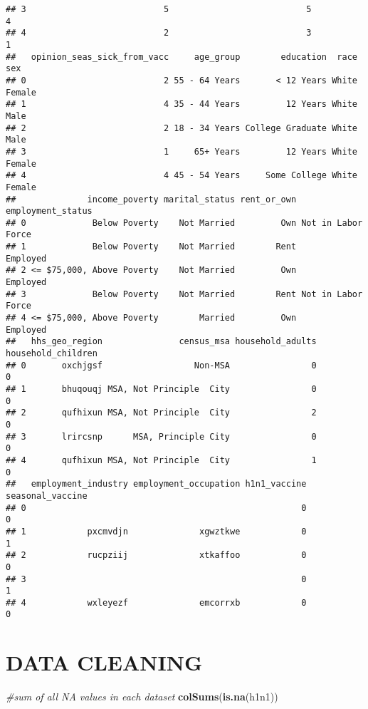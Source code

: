 \documentclass[
]{article}
\newenvironment{Shaded}{\begin{snugshade}}{\end{snugshade}}
\newcommand{\CommentTok}[1]{\textcolor[rgb]{0.56,0.35,0.01}{\textit{#1}}}
\newcommand{\FunctionTok}[1]{\textcolor[rgb]{0.13,0.29,0.53}{\textbf{#1}}}
\newcommand{\NormalTok}[1]{#1}
\begin{document}
\begin{verbatim}
## 3                           5                           5                 4
## 4                           2                           3                 1
##   opinion_seas_sick_from_vacc     age_group        education  race    sex
## 0                           2 55 - 64 Years       < 12 Years White Female
## 1                           4 35 - 44 Years         12 Years White   Male
## 2                           2 18 - 34 Years College Graduate White   Male
## 3                           1     65+ Years         12 Years White Female
## 4                           4 45 - 54 Years     Some College White Female
##              income_poverty marital_status rent_or_own  employment_status
## 0             Below Poverty    Not Married         Own Not in Labor Force
## 1             Below Poverty    Not Married        Rent           Employed
## 2 <= $75,000, Above Poverty    Not Married         Own           Employed
## 3             Below Poverty    Not Married        Rent Not in Labor Force
## 4 <= $75,000, Above Poverty        Married         Own           Employed
##   hhs_geo_region               census_msa household_adults household_children
## 0       oxchjgsf                  Non-MSA                0                  0
## 1       bhuqouqj MSA, Not Principle  City                0                  0
## 2       qufhixun MSA, Not Principle  City                2                  0
## 3       lrircsnp      MSA, Principle City                0                  0
## 4       qufhixun MSA, Not Principle  City                1                  0
##   employment_industry employment_occupation h1n1_vaccine seasonal_vaccine
## 0                                                      0                0
## 1            pxcmvdjn              xgwztkwe            0                1
## 2            rucpziij              xtkaffoo            0                0
## 3                                                      0                1
## 4            wxleyezf              emcorrxb            0                0
\end{verbatim}

\section{DATA CLEANING}\label{data-cleaning}

\begin{Shaded}
\begin{Highlighting}[]
\CommentTok{\#sum of all NA values in each dataset}
\FunctionTok{colSums}\NormalTok{(}\FunctionTok{is.na}\NormalTok{(h1n1))}
\end{Highlighting}
\end{Shaded}
\end{document}
